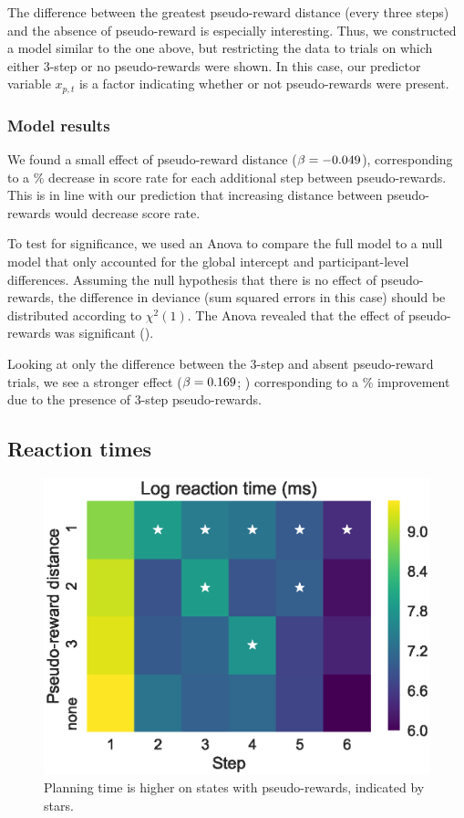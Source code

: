 \documentclass[10pt,letterpaper]{article}
\begin{document}
The difference between the greatest pseudo-reward distance (every three steps) and the absence of pseudo-reward is especially interesting. Thus, we constructed a model similar to the one above, but restricting the data to trials on which either 3-step or no pseudo-rewards were shown. In this case, our predictor variable $x_{p,t}$ is a factor indicating whether or not pseudo-rewards were present.


\subsubsection{Model results} %

We found a small effect of pseudo-reward distance ($\beta = -0.049$), corresponding to a \WorsenRate\% decrease in score rate for each additional step between pseudo-rewards. This is in line with our prediction that increasing distance between pseudo-rewards would decrease score rate.

To test for significance, we used an Anova to compare the full model to a null model that only accounted for the global intercept and participant-level differences. Assuming the null hypothesis that there is no effect of pseudo-rewards, the difference in deviance (sum squared errors in this case) should be distributed according to $\chi^2(1)$. The Anova revealed that the effect of pseudo-rewards was significant (\AovRateFull).

Looking at only the difference between the 3-step and absent pseudo-reward trials, we see a stronger effect ($\beta = 0.169$; \AovThreeFull) corresponding to a \ImprovementThree\% improvement due to the presence of 3-step pseudo-rewards. 


\subsection{Reaction times}\label{planning-time}

\begin{figure}
  \centering
  \includegraphics[width=\linewidth]{figs/plan_time.eps}
  \caption{Planning time is higher on states with pseudo-rewards, indicated by stars.}
  \label{fig:plan-time}
\end{figure}
\end{document}
